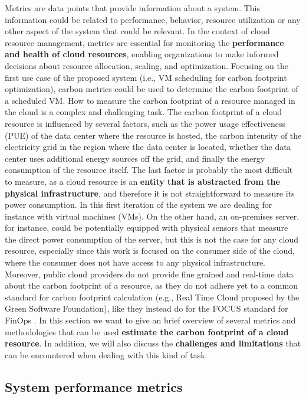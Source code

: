 Metrics are data points that provide information about a system.
This information could be related to performance, behavior, resource utilization or any other aspect of the system that could be relevant.
In the context of cloud resource management, metrics are essential for monitoring the \textbf{performance and health of cloud resources}, enabling organizations to make informed decisions about resource allocation, scaling, and optimization.
Focusing on the first use case of the proposed system (i.e., VM scheduling for carbon footprint optimization), carbon metrics could be used to determine the carbon footprint of a scheduled VM.
How to measure the carbon footprint of a resource managed in the cloud is a complex and challenging task.
The carbon footprint of a cloud resource is influenced by several factors, such as the power usage effectiveness (PUE) of the data center where the resource is hosted, the carbon intensity of the electricity grid in the region where the data center is located, whether the data center uses additional energy sources off the grid, and finally the energy consumption of the resource itself.
The last factor is probably the most difficult to measure, as a cloud resource is an \textbf{entity that is abstracted from the physical infrastructure}, and therefore it is not straightforward to measure its power consumption. 
In this first iteration of the system we are dealing for instance with virtual machines (VMs).
On the other hand, an on-premises server, for instance, could be potentially equipped with physical sensors that measure the direct power consumption of the server, but this is not the case for any cloud resource, especially since this work is focused on the consumer side of the cloud, where the consumer does not have access to any physical infrastructure.
Moreover, public cloud providers do not provide fine grained and real-time data about the carbon footprint of a resource, as they do not adhere yet to a common standard for carbon footprint calculation (e.g., Real Time Cloud proposed by the Green Software Foundation), like they instead do for the FOCUS standard for FinOps \cite{finops_focus_spec}.
In this section we want to give an brief overview of several metrics and methodologies that can be used \textbf{estimate the carbon footprint of a cloud resource}.
In addition, we will also discuss the \textbf{challenges and limitations} that can be encountered when dealing with this kind of task.

\subsection{System performance metrics}

